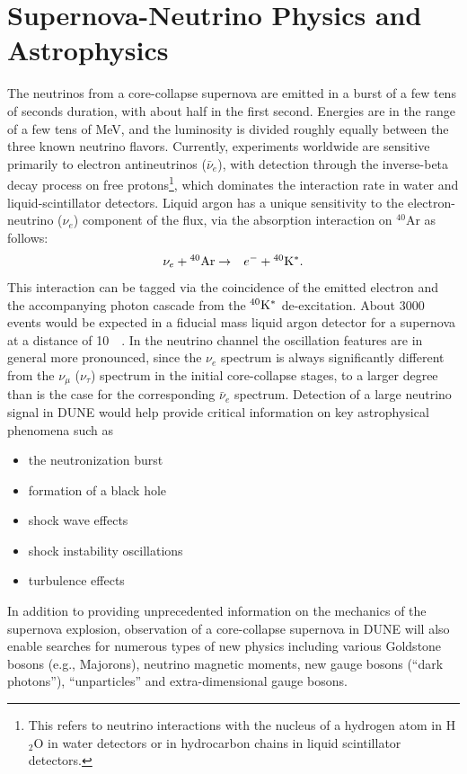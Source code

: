 \section{Supernova-Neutrino Physics and Astrophysics}

The neutrinos from a core-collapse supernova are emitted in a burst of
a few tens of seconds duration, with about half in the first
second. Energies are in the range of a few tens of MeV, and the
luminosity is divided roughly equally between the three known neutrino
flavors.  Currently, experiments worldwide are sensitive primarily to
electron antineutrinos ($\bar{\nu}_e$), with detection through the inverse-beta decay
process on free protons\footnote{This refers to neutrino interactions with the nucleus of a
hydrogen atom in H$_2$O in water detectors or in hydrocarbon chains in 
liquid scintillator detectors.},
 which dominates the interaction rate in water
and liquid-scintillator detectors.  Liquid argon has a unique sensitivity to
the electron-neutrino ($\nu_e$) component of the flux, via the absorption
interaction on $^{40}$Ar as follows:
\begin{eqnarray*}
\nu_e +{}^{40}{\rm Ar} & \rightarrow & e^-+{}^{40}{\rm K^*}.
\end{eqnarray*} 
This interaction can be tagged via the coincidence of the emitted
electron and the accompanying photon cascade from the $^{40}{\rm K^*}$
de-excitation.  About \num{3000} events would be expected in a 
fiducial mass liquid argon detector for a supernova at a distance of
\SI{10}{\kilo\parsec}.  In the neutrino channel the oscillation
features are in general more pronounced, since the $\nu_e$ spectrum is
always significantly different from the $\nu_\mu$ ($\nu_\tau$) spectrum 
in the initial core-collapse stages, to a larger degree than is the
case for the corresponding $\bar{\nu}_e$ spectrum.  Detection of a large
neutrino signal in DUNE would help provide critical information on key
astrophysical phenomena such as
\begin{itemize}
\item the neutronization burst
\item formation of a black hole
\item shock wave effects
\item shock instability oscillations
\item turbulence effects
\end{itemize}

In addition to providing unprecedented information on the mechanics of
the supernova explosion, observation of a core-collapse supernova in
DUNE will also enable searches for numerous types of new physics
including various Goldstone bosons (e.g., Majorons), neutrino magnetic
moments, new gauge bosons (``dark photons''), ``unparticles'' and
extra-dimensional gauge bosons.

